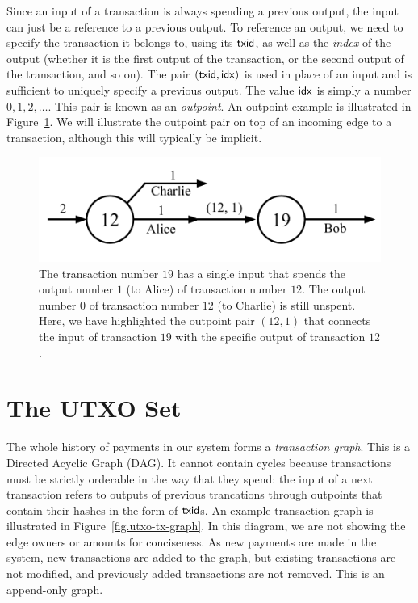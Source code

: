 Since an input of a transaction is always spending a previous output, the input can just be a
reference to a previous output. To reference an output, we need to specify the transaction it
belongs to, using its $\mathsf{txid}$, as well as the \emph{index} of the output (whether it is the first
output of the transaction, or the second output of the transaction, and so on). The pair
$(\mathsf{txid}, \mathsf{idx})$ is used in place of an input and is sufficient to uniquely specify a previous
output. The value $\mathsf{idx}$ is simply a number $0, 1, 2, \ldots$.
This pair is known as an \emph{outpoint}. An outpoint example is illustrated
in Figure~\ref{fig.utxo-outpoint}. We will illustrate the outpoint pair on top of an
incoming edge to a transaction, although this will typically be implicit.

\begin{figure}[h]
    \centering
    \includegraphics[width=0.65 \columnwidth,keepaspectratio]{figures/utxo-outpoint.pdf}
    \caption{The transaction number $19$ has a single input that spends the output number $1$ (to Alice)
             of transaction number $12$.
             The output number $0$ of transaction number $12$ (to Charlie) is still unspent.
             Here, we have highlighted the outpoint pair $(12, 1)$ that connects the input
             of transaction $19$ with the specific output of transaction $12$.}
    \label{fig.utxo-outpoint}
\end{figure}

\section{The UTXO Set}

The whole history of payments in our system forms a \emph{transaction graph}.
This is a Directed Acyclic Graph (DAG). It cannot contain cycles because transactions must be
strictly orderable in the way that they spend: the input of a next transaction refers to
outputs of previous trancations through outpoints that contain their hashes in the form of $\mathsf{txid}$s.
An example transaction graph is illustrated in Figure~\ref{fig.utxo-tx-graph}. In this diagram,
we are not showing the edge owners or amounts for conciseness. As new payments are made in the system,
new transactions are added to the graph, but existing transactions are not modified, and previously
added transactions are not removed. This is an append-only graph.

